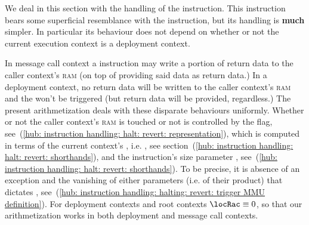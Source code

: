 We deal in this section with the handling of the  instruction.
This instruction bears some superficial resemblance with the  instruction, but its handling is \textbf{much} simpler.
In particular its behaviour does not depend on whether or not the current execution context is a deployment context. \vspace{1mm}

\saNote{} In  message call context a  instruction may write a portion of return data to the caller context's \textsc{ram} (on top of providing said data as return data.) In a deployment context, no return data will be written to the caller context's \textsc{ram} and the \mmuMod{} won't be triggered (but return data will be provided, regardless.) The present arithmetization deals with these disparate behaviours uniformly.
Whether or not the caller context's \textsc{ram} is touched or not is controlled by the 
\locTriggerMmu{} flag, see~(\ref{hub: instruction handling: halt: revert: representation}), which is computed in terms of
the current context's \RAC{}, i.e. \locRac{}, see section~(\ref{hub: instruction handling: halt: revert: shorthands}), and the instruction's size parameter \locSize{}, see~(\ref{hub: instruction handling: halt: revert: shorthands}). To be precise, it is absence of an exception and the vanishing of either parameters (i.e. of their product) that dictates \locTriggerMmu, see~(\ref{hub: instruction handling: halting: revert: trigger MMU definition}).
For deployment contexts and root contexts $\locRac \equiv 0$, so that our arithmetization works in both deployment and message call contexts.
